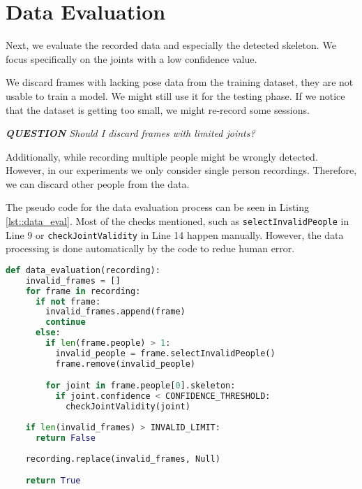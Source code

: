 \section{Data Evaluation}
\label{sec:data_evaluation}

Next, we evaluate the recorded data and especially the detected skeleton. We focus specifically on the joints with a low confidence value. 

We discard frames with lacking pose data from the training dataset, they are not usable to train a model. We might still use it for the testing phase. If we notice that the dataset is getting too small, we might re-record some sessions.

\textit{\textbf{QUESTION} Should I discard frames with limited joints?}

Additionally, while recording multiple people might be wrongly detected. However, in our experiments we only consider single person recordings. Therefore, we can discard other people from the data.

The pseudo code for the data evaluation process can be seen in Listing \ref{lst::data_eval}. Most of the checks mentioned, such as \texttt{selectInvalidPeople} in Line 9 or \texttt{checkJointValidity} in Line 14 happen manually. However, the data processing is done automatically by the code to redue human error.

\begin{lstlisting}[language=python,
                    firstnumber=1,
                    caption={[Pseudo code for data evaluation]{Pseudo code for data evaluation}},
                    label={lst:data_eval}]
  def data_evaluation(recording):
    invalid_frames = []
    for frame in recording:
      if not frame:
        invalid_frames.append(frame)
        continue
      else:
        if len(frame.people) > 1:
          invalid_people = frame.selectInvalidPeople()
          frame.remove(invalid_people)

        for joint in frame.people[0].skeleton:
          if joint.confidence < CONFIDENCE_THRESHOLD:
            checkJointValidity(joint)
    
    if len(invalid_frames) > INVALID_LIMIT:
      return False
    
    recording.replace(invalid_frames, Null)

    return True
\end{lstlisting}
